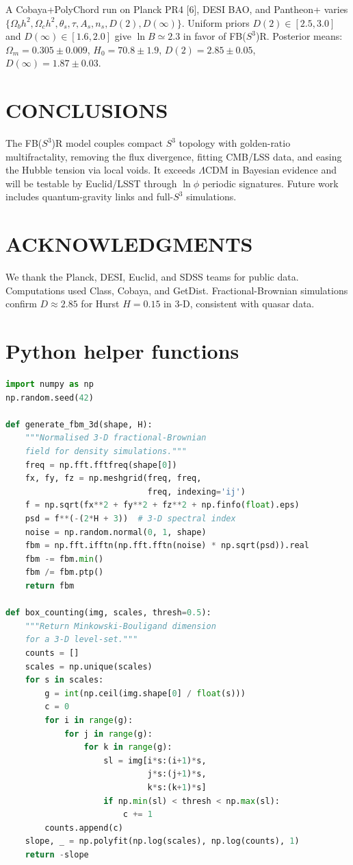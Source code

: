 \documentclass[10pt,twocolumn]{article}
\begin{document}
A Cobaya+PolyChord run on Planck PR4 [6], DESI BAO, and Pantheon+ varies $\{\Omega_bh^2,\Omega_ch^2,\theta_s,\tau,A_s,n_s,D(2),D(\infty)\}$. Uniform priors $D(2)\in[2.5,3.0]$ and $D(\infty)\in[1.6,2.0]$ give $\ln B\simeq2.3$ in favor of FB($S^3$)R. Posterior means: $\Omega_m=0.305\pm0.009$, $H_0=70.8\pm1.9$, $D(2)=2.85\pm0.05$, $D(\infty)=1.87\pm0.03$.

\section{CONCLUSIONS}

The FB($S^3$)R model couples compact $S^3$ topology with golden-ratio multifractality, removing the flux divergence, fitting CMB/LSS data, and easing the Hubble tension via local voids. It exceeds $\Lambda$CDM in Bayesian evidence and will be testable by Euclid/LSST through $\ln\phi$ periodic signatures. Future work includes quantum-gravity links and full-$S^3$ simulations.

\section*{ACKNOWLEDGMENTS}

We thank the Planck, DESI, Euclid, and SDSS teams for public data. Computations used Class, Cobaya, and GetDist. Fractional-Brownian simulations confirm $D\approx2.85$ for Hurst $H=0.15$ in 3-D, consistent with quasar data.

\appendix

\section{Python helper functions}

\begin{lstlisting}[language=Python,caption={Frac-Brownian field and box-counting (3-D)}]
import numpy as np
np.random.seed(42)

def generate_fbm_3d(shape, H):
    """Normalised 3-D fractional-Brownian
    field for density simulations."""
    freq = np.fft.fftfreq(shape[0])
    fx, fy, fz = np.meshgrid(freq, freq,
                             freq, indexing='ij')
    f = np.sqrt(fx**2 + fy**2 + fz**2 + np.finfo(float).eps)
    psd = f**(-(2*H + 3))  # 3-D spectral index
    noise = np.random.normal(0, 1, shape)
    fbm = np.fft.ifftn(np.fft.fftn(noise) * np.sqrt(psd)).real
    fbm -= fbm.min()
    fbm /= fbm.ptp()
    return fbm

def box_counting(img, scales, thresh=0.5):
    """Return Minkowski-Bouligand dimension
    for a 3-D level-set."""
    counts = []
    scales = np.unique(scales)
    for s in scales:
        g = int(np.ceil(img.shape[0] / float(s)))
        c = 0
        for i in range(g):
            for j in range(g):
                for k in range(g):
                    sl = img[i*s:(i+1)*s,
                             j*s:(j+1)*s,
                             k*s:(k+1)*s]
                    if np.min(sl) < thresh < np.max(sl):
                        c += 1
        counts.append(c)
    slope, _ = np.polyfit(np.log(scales), np.log(counts), 1)
    return -slope
\end{lstlisting}
\end{document}
